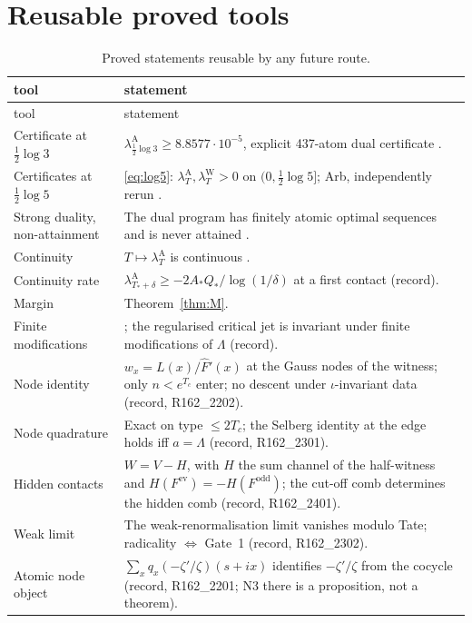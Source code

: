 \documentclass[11pt]{amsart}
\theoremstyle{definition}
\theoremstyle{remark}
\newcommand{\lamA}{\lambda^{\mathrm A}_T}
\newcommand{\lamW}{\lambda^{\mathrm W}_T}
\begin{document}
\section{Reusable proved tools}\label{sec:tools}

\begin{longtable}{@{}p{4.2cm}p{10.3cm}@{}}
\caption{Proved statements reusable by any future route.}\label{tab:tools}\\
\toprule
tool & statement \\
\midrule\endfirsthead
\toprule tool & statement \\ \midrule\endhead
\bottomrule\endfoot
Certificate at $\frac12\log3$ & $\lambda^{\mathrm A}_{\frac12\log3}\ge8.8577\cdot10^{-5}$, explicit 437-atom dual certificate \cite[Thm.~5.1]{Paper47}. \\
Certificates at $\frac12\log5$ & \eqref{eq:log5}: $\lamA,\lamW>0$ on $(0,\frac12\log5]$; Arb, independently rerun \cite[Thm.~15.2]{Paper47}. \\
Strong duality, non-attainment & The dual program has finitely atomic optimal sequences and is never attained \cite[\S3]{Paper47}. \\
Continuity & $T\mapsto\lamA$ is continuous \cite[Lem.~17.1]{Paper47}. \\
Continuity rate & $\lambda^{\mathrm A}_{T_*+\delta}\ge-2A_*Q_*/\log(1/\delta)$ at a first contact (record). \\
Margin & Theorem~\ref{thm:M}. \\
Finite modifications & \cite[Thm.~12.5]{Paper47}; the regularised critical jet is invariant under finite modifications of $\Lambda$ (record). \\
Node identity & $w_x=L(x)/\widehat F'(x)$ at the Gauss nodes of the witness; only $n<e^{T_c}$ enter; no descent under $\iota$-invariant data (record, R162\_2202). \\
Node quadrature & Exact on type $\le2T_c$; the Selberg identity at the edge holds iff $a=\Lambda$ (record, R162\_2301). \\
Hidden contacts & $W=V-H$, with $H$ the sum channel of the half-witness and $H(F^{\mathrm{ev}})=-H(F^{\mathrm{odd}})$; the cut-off comb determines the hidden comb (record, R162\_2401). \\
Weak limit & The weak-renormalisation limit vanishes modulo Tate; radicality $\iff$ Gate~1 (record, R162\_2302). \\
Atomic node object & $\sum_xq_x(-\zeta'/\zeta)(s+ix)$ identifies $-\zeta'/\zeta$ from the cocycle (record, R162\_2201; N3 there is a proposition, not a theorem). \\

\end{longtable}
\end{document}
